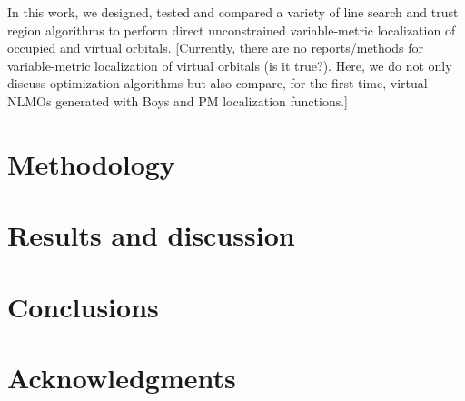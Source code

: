\documentclass[aps,prl,reprint,amsmath,amssymb]{revtex4-1}
\begin{document}
In this work, we designed, tested and compared a variety of line search and trust region algorithms to perform direct unconstrained variable-metric localization of occupied and virtual orbitals. [Currently, there are no reports/methods for variable-metric localization of virtual orbitals (is it true?). Here, we do not only discuss optimization algorithms but also compare, for the first time, virtual NLMOs generated with Boys and PM localization functions.]


\section{Methodology}


\section{Results and discussion}

\section{Conclusions}


\section{Acknowledgments} 


%

\end{document}
